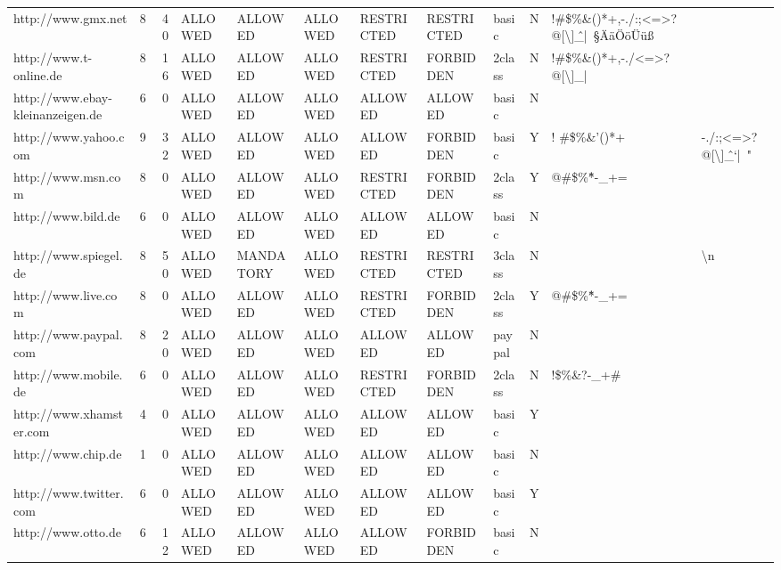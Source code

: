 \begin{table}[htbp]
{{\begin{tabular}{lrrlllllllrr}
    http://www.gmx.net & 8     & 40    & ALLOWED & ALLOWED & ALLOWED & RESTRICTED & RESTRICTED & basic & N     & \multicolumn{1}{l}{ !\#\$\%\&()*+,-./:;<=>?@[\textbackslash{}]\^\_{|}~§ÄäÖöÜüß} &  \\
    http://www.t-online.de & 8     & 16    & ALLOWED & ALLOWED & ALLOWED & RESTRICTED & FORBIDDEN & 2class & N     & \multicolumn{1}{l}{!\#\$\%\&()*+,-./<=>?@[\textbackslash{}]\_{|}~} &  \\
    http://www.ebay-kleinanzeigen.de & 6     & 0     & ALLOWED & ALLOWED & ALLOWED & ALLOWED & ALLOWED & basic & N     &       &  \\
    http://www.yahoo.com & 9     & 32    & ALLOWED & ALLOWED & ALLOWED & ALLOWED & FORBIDDEN & basic & Y     & \multicolumn{1}{l}{! \#\$\%\&'()*+} & \multicolumn{1}{l}{-./:;<=>?@[\textbackslash{}]\^\_`{|}~"} \\
    http://www.msn.com & 8     & 0     & ALLOWED & ALLOWED & ALLOWED & RESTRICTED & FORBIDDEN & 2class & Y     & \multicolumn{1}{l}{@\#\$\%\^*-\_+=} &  \\
    http://www.bild.de & 6     & 0     & ALLOWED & ALLOWED & ALLOWED & ALLOWED & ALLOWED & basic & N     &       &  \\
    http://www.spiegel.de & 8     & 50    & ALLOWED & MANDATORY & ALLOWED & RESTRICTED & RESTRICTED & 3class & N     &       & \multicolumn{1}{l}{ \textbackslash{}n} \\
    http://www.live.com & 8     & 0     & ALLOWED & ALLOWED & ALLOWED & RESTRICTED & FORBIDDEN & 2class & Y     & \multicolumn{1}{l}{@\#\$\%\^*-\_+=} &  \\
    http://www.paypal.com & 8     & 20    & ALLOWED & ALLOWED & ALLOWED & ALLOWED & ALLOWED & paypal & N     &       &  \\
    http://www.mobile.de & 6     & 0     & ALLOWED & ALLOWED & ALLOWED & RESTRICTED & FORBIDDEN & 2class & N     & \multicolumn{1}{l}{!\$\%\&?-\_+\#} &  \\
    http://www.xhamster.com & 4     & 0     & ALLOWED & ALLOWED & ALLOWED & ALLOWED & ALLOWED & basic & Y     &       &  \\
    http://www.chip.de & 1     & 0     & ALLOWED & ALLOWED & ALLOWED & ALLOWED & ALLOWED & basic & N     &       &  \\
    http://www.twitter.com & 6     & 0     & ALLOWED & ALLOWED & ALLOWED & ALLOWED & ALLOWED & basic & Y     &       &  \\
    http://www.otto.de & 6     & 12    & ALLOWED & ALLOWED & ALLOWED & ALLOWED & FORBIDDEN & basic & N     &       &  \\

\end{tabular}}}
\end{table}
